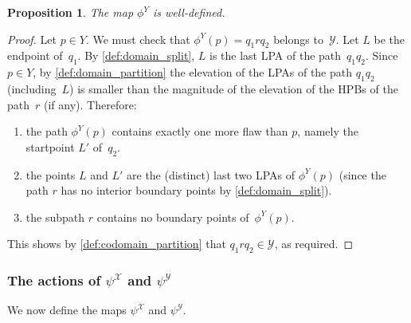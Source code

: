 \documentclass[11pt]{article}
\newtheorem{prop}[thm]{Proposition}
\theoremstyle{definition} %
\numberwithin{equation}{section}
\begin{document}
\begin{prop}
The map $\phi^Y$ is well-defined.
\label{rem:codomain_phi_Y}
\end{prop}
\begin{proof}
    Let $p\in Y$. 
    We must check that 
    $\phi^Y(p) = q_1 r q_2$ belongs to~$\mathcal{Y}$.
    Let $L$ be the endpoint of~$q_1$.
    By \cref{def:domain_split}, $L$ is the last LPA of the path~$q_1 q_2$.
    Since $p \in Y$, by \cref{def:domain_partition} the elevation of the LPAs of the path $q_1 q_2$ (including~$L$) is smaller than the magnitude of the elevation of the HPBs of the path~$r$ (if any). Therefore:
    \begin{enumerate}
        \item the path $\phi^Y(p)$ contains exactly one more flaw than $p$, namely the startpoint $L'$ of~$q_2$.
        \item the points $L$ and $L'$ are the (distinct) last two LPAs of $\phi^Y(p)$ (since the path $r$ has no interior boundary points by \cref{def:domain_split}). 
        \item the subpath $r$ contains no boundary points of~$\phi^Y(p)$.
    \end{enumerate}
    This shows by \cref{def:codomain_partition} that $q_1 r q_2 \in \mathcal{Y}$, as required.
\end{proof}


\subsubsection{The actions of \texorpdfstring{$\psi^\mathcal X$ and $\psi^\mathcal Y$}{psi\^X and psi\^Y}}
\label{subsec:psi_action}

We now define the maps $\psi^\mathcal X$ and $\psi^\mathcal Y$.  
\end{document}
